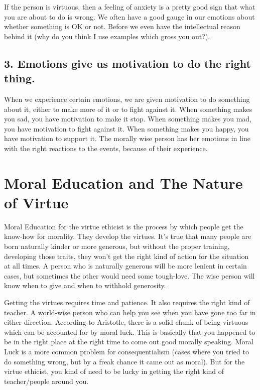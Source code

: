 If the person is virtuous, then a feeling of anxiety is a pretty good sign that what you are about to do is wrong. We often have a good gauge in our emotions about whether something is OK or not. Before we even have the intellectual reason behind it (why do you think I use examples which gross you out?).
\subsection{3. Emotions give us motivation to do the right thing.}

When we experience certain emotions, we are given motivation to do something about it, either to make more of it or to fight against it. When something makes you sad, you have motivation to make it stop. When something makes you mad, you have motivation to fight against it. When something makes you happy, you have motivation to support it. The morally wise person has her emotions in line with the right reactions to the events, because of their experience.

\section{Moral Education and The Nature of Virtue}

Moral Education for the virtue ethicist is the process by which people get the know-how for morality. They develop the virtues. It’s true that many people are born naturally kinder or more generous, but without the proper training, developing those traits, they won’t get the right kind of action for the situation at all times. A person who is naturally generous will be more lenient in certain cases, but sometimes the other would need some tough-love. The wise person will know when to give and when to withhold generosity.

Getting the virtues requires time and patience. It also requires the right kind of teacher. A world-wise person who can help you see when you have gone too far in either direction. According to Aristotle, there is a solid chunk of being virtuous which can be accounted for by moral luck. This is basically that you happened to be in the right place at the right time to come out good morally speaking. Moral Luck is a more common problem for consequentialism (cases where you tried to do something wrong, but by a freak chance it came out as moral). But for the virtue ethicist, you kind of need to be lucky in getting the right kind of teacher/people around you.

